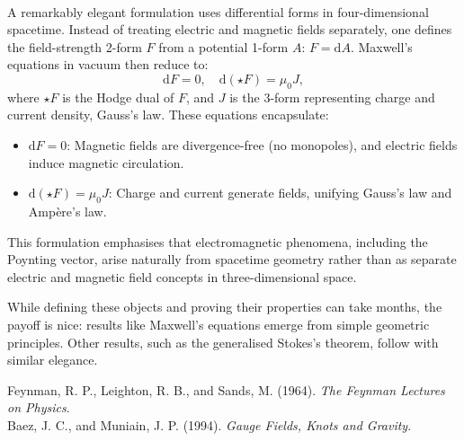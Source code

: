 \begin{technical}
\vspace{0.4em}
\\[0.5em]
A remarkably elegant formulation uses differential forms in four-dimensional spacetime. Instead of treating electric and magnetic fields separately, one defines the field-strength 2-form $F$ from a potential 1-form $A$: $F = \mathrm{d}A$. Maxwell's equations in vacuum then reduce to:
\[
\mathrm{d}F = 0, 
\quad
\mathrm{d}(\star F) = \mu_0 J,
\]
where $\star F$ is the Hodge dual of $F$, and $J$ is the 3-form representing charge and current density, Gauss's law. These equations encapsulate:
\begin{itemize}[leftmargin=*]
\item $\mathrm{d}F = 0$: Magnetic fields are divergence-free (no monopoles), and electric fields induce magnetic circulation.
\item $\mathrm{d}(\star F) = \mu_0 J$: Charge and current generate fields, unifying Gauss's law and Ampère's law.
\end{itemize}
This formulation emphasises that electromagnetic phenomena, including the Poynting vector, arise naturally from spacetime geometry rather than as separate electric and magnetic field concepts in three-dimensional space. 

While defining these objects and proving their properties can take months, the payoff is nice: results like Maxwell’s equations emerge from simple geometric principles. Other results, such as the generalised Stokes’s theorem, follow with similar elegance.

\techref
{\footnotesize
Feynman, R. P., Leighton, R. B., and Sands, M. (1964). \textit{The Feynman Lectures on Physics}.\\
Baez, J. C., and Muniain, J. P. (1994). \textit{Gauge Fields, Knots and Gravity}.\\
}
\end{technical}